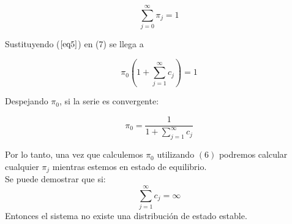 \begin{equation}
\sum_{j=0}^{\infty}\pi_j=1 
\label{eq6}
\end{equation}

Sustituyendo ($\ref{eq5}$) en (7) se llega a

\begin{equation*}
\pi_0 \left( 1+\sum_{j=1}^{\infty} c_j \right) = 1 
\end{equation*}

Despejando $\pi_0$, si la serie es convergente:

\begin{equation}
\pi_0=\dfrac{1}{1+\sum_{j=1}^{\infty} c_j}
\label{eq6}
\end{equation}

Por lo tanto, una vez que calculemos $\pi_0$ utilizando $(6)$ podremos calcular cualquier $\pi_j$ mientras estemos en estado de equilibrio. \\
Se puede demostrar que si:
$$
\sum_{j=1}^{\infty} c_j = \infty $$
Entonces el sistema no existe una distribución de estado estable.